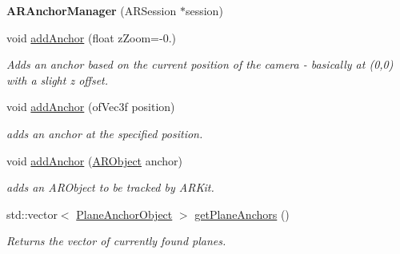 \begin{DoxyCompactItemize}
\item 
\mbox{\label{class_a_r_core_1_1_a_r_anchor_manager_a471dcdacaedea4647a04c34052742a61}} 
{\bfseries A\+R\+Anchor\+Manager} (A\+R\+Session $\ast$session)
\item 
\mbox{\label{class_a_r_core_1_1_a_r_anchor_manager_a462546bf84296188fd899d533a3c17bd}} 
void \hyperlink{class_a_r_core_1_1_a_r_anchor_manager_a462546bf84296188fd899d533a3c17bd}{add\+Anchor} (float z\+Zoom=-\/0.)
\begin{DoxyCompactList}\small\item\em Adds an anchor based on the current position of the camera -\/ basically at (0,0) with a slight z offset. \end{DoxyCompactList}\item 
\mbox{\label{class_a_r_core_1_1_a_r_anchor_manager_a60602a79fbc9bf27e5f88bc0b3984ac4}} 
void \hyperlink{class_a_r_core_1_1_a_r_anchor_manager_a60602a79fbc9bf27e5f88bc0b3984ac4}{add\+Anchor} (of\+Vec3f position)
\begin{DoxyCompactList}\small\item\em adds an anchor at the specified position. \end{DoxyCompactList}\item 
\mbox{\label{class_a_r_core_1_1_a_r_anchor_manager_ae710a985f06cfe488f218f49e8d0329a}} 
void \hyperlink{class_a_r_core_1_1_a_r_anchor_manager_ae710a985f06cfe488f218f49e8d0329a}{add\+Anchor} (\hyperlink{struct_a_r_objects_1_1_a_r_object}{A\+R\+Object} anchor)
\begin{DoxyCompactList}\small\item\em adds an A\+R\+Object to be tracked by A\+R\+Kit. \end{DoxyCompactList}\item 
\mbox{\label{class_a_r_core_1_1_a_r_anchor_manager_a46a02253729234aef5617512f48e9211}} 
std\+::vector$<$ \hyperlink{struct_a_r_objects_1_1_plane_anchor_object}{Plane\+Anchor\+Object} $>$ \hyperlink{class_a_r_core_1_1_a_r_anchor_manager_a46a02253729234aef5617512f48e9211}{get\+Plane\+Anchors} ()
\begin{DoxyCompactList}\small\item\em Returns the vector of currently found planes. \end{DoxyCompactList}\item 

\end{DoxyCompactItemize}
